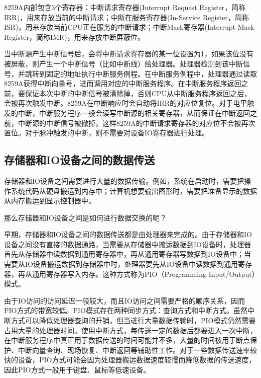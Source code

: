 \documentclass[]{ctexbook}
\begin{document}
8259A内部包含3个寄存器：中断请求寄存器(Interrupt Request Register，简称IRR)，用来存放当前的中断请求；中断在服务寄存器(In-Service Register，简称ISR)，用来存放当前CPU正在服务的中断请求；中断Mask寄存器(Interrupt Mask Register，简称IMR)，用来存放中断屏蔽位。

当中断源产生中断信号后，会将中断请求寄存器的某一位设置为1，如果该位没有被屏蔽，则产生一个中断信号（比如中断线）给处理器。处理器检测到该中断信号，并跳转到固定的地址执行中断服务例程。在中断服务例程中，处理器通过读取8259A获得中断向量号，进而调用对应的中断服务程序。在中断服务程序返回之前，要保证本次中断的中断信号被清除掉，否则CPU从中断服务程序返回之后，会被再次触发中断。8259A在中断响应时会自动将IRR的对应位复位。对于电平触发的中断，中断服务程序一般会读写中断源的相关寄存器，从而保证在中断返回之前，中断源的中断信号被撤掉，这样8259A的中断请求寄存器的对应位不会被再次置位。对于脉冲触发的中断，则不需要对设备IO寄存器进行处理。

\hypertarget{ux5b58ux50a8ux5668ux548cioux8bbeux5907ux4e4bux95f4ux7684ux6570ux636eux4f20ux9001}{%
\subsection{存储器和IO设备之间的数据传送}\label{ux5b58ux50a8ux5668ux548cioux8bbeux5907ux4e4bux95f4ux7684ux6570ux636eux4f20ux9001}}

存储器和IO设备之间需要进行大量的数据传输。例如，系统在启动时，需要把操作系统代码从硬盘搬运到内存中；计算机想要输出图形时，需要把准备显示的数据从内存搬运到显示控制器中。

那么存储器和IO设备之间是如何进行数据交换的呢？

早期，存储器和IO设备之间的数据传送都是由处理器来完成的。由于存储器和IO设备之间没有直接的数据通路，当需要从存储器中搬运数据到IO设备时，处理器首先从存储器中读数据到通用寄存器中，再从通用寄存器写数据到IO设备中；当需要从IO设备搬运数据到存储器中时，处理器要先从IO设备中读数据到通用寄存器，再从通用寄存器写入内存。这种方式称为PIO（Programming Input/Output）模式。

由于IO访问的访问延迟一般较大，而且IO访问之间需要严格的顺序关系，因而PIO方式的带宽较低。PIO模式存在两种同步方式：查询方式和中断方式。虽然中断方式可以降低处理器查询的开销，但当进行大量数据传输时，PIO模式仍然需要占用大量的处理器时间。使用中断方式，每传送一定的数据后都要进入一次中断，在中断服务程序中真正用于数据传送的时间可能并不多，大量的时间被用于断点保护、中断向量查询、现场恢复、中断返回等辅助性工作。对于一些数据传送速率较快的设备，PIO方式可能会因为处理器搬运数据速度较慢而降低数据的传送速度，因此PIO方式一般用于键盘、鼠标等低速设备。
\end{document}
